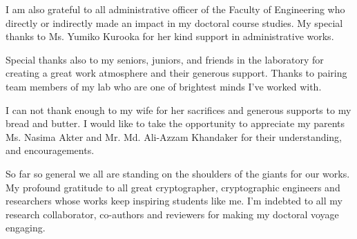 \documentclass[a4paper]{article}
\begin{document}
\vspace{5pt}
I am also grateful to all  administrative officer of the Faculty of Engineering who directly or indirectly made an impact in my doctoral course studies. My special thanks to Ms. Yumiko Kurooka for her kind support in administrative works.

\vspace{5pt}
Special thanks also to my seniors, juniors, and friends in the  laboratory for creating a great work atmosphere and their generous support.  
Thanks to pairing team members of my lab who are one of brightest minds I've worked with.

\vspace{5pt}
I can not thank enough to my wife for her sacrifices and generous supports to my bread and butter. 
I would like to take the opportunity to appreciate my parents Ms. Nasima Akter and Mr. Md. Ali-Azzam Khandaker for their understanding, and encouragements.

\vspace{5pt}
So far so general we all are standing on the shoulders of the giants for our works. 
My profound gratitude to all great cryptographer, cryptographic engineers and researchers whose works keep inspiring students like me.
I'm indebted to all my research collaborator, co-authors and reviewers for making my doctoral voyage engaging.
\end{document}

